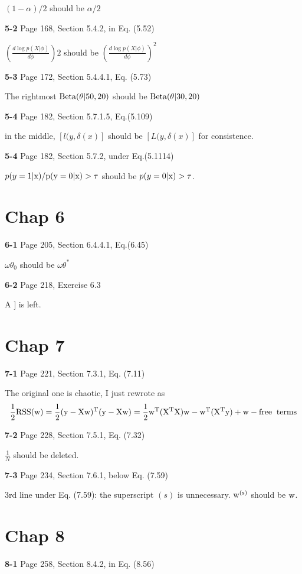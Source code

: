 \documentclass[aps,preprint,a4]{revtex4-1}
\newcommand{\nl}{\nonumber \\}
\begin{document}
$(1-\alpha)/2$ should be $\alpha/2$

{\color{red}\textbf{5-2}} Page 168, Section 5.4.2, in Eq. (5.52)

$\left(\frac{d\log p(X|\phi)}{d\phi}\right)2$ should be
$\left(\frac{d\log p(X|\phi)}{d\phi}\right)^{2}$ 

{\color{red}\textbf{5-3}} Page 172, Section 5.4.4.1, Eq. (5.73)

The rightmost $\rm Beta(\theta|50,20)$ should be
$\rm Beta(\theta|30,20)$

{\color{red}\textbf{5-4}} Page 182, Section 5.7.1.5, Eq.(5.109)

in the middle, $[l(y,\delta(x)]$ should be $[L(y,\delta(x)]$ for consistence.

{\color{red}\textbf{5-4}} Page 182, Section 5.7.2, under Eq.(5.1114)

$p(y=1|\rm x)/p(y=0|\rm x)>\tau$ should be $p(y=0|\rm x)>\tau$.

\section{Chap 6}
{\color{red}\textbf{6-1}} Page 205, Section 6.4.4.1, Eq.(6.45)

$\omega\theta_{0}$ should be $\omega\theta^{*}$

{\color{red}\textbf{6-2}} Page 218, Exercise 6.3

A $]$ is left.


\section{Chap 7}
{\color{red}\textbf{7-1}} Page 221, Section 7.3.1, Eq. (7.11)

The original one is chaotic, I just rewrote as
\begin{equation}
\frac{1}{2} \rm RSS(w) = \frac{1}{2}(y-Xw)^{T}(y-Xw) = \frac{1}{2}w^{T}(X^{T}X)w
-w^{T}(X^{T}y) + \rm{w-free \;\; terms}\nl
\end{equation}

{\color{red}\textbf{7-2}} Page 228, Section 7.5.1, Eq. (7.32)

$\frac{1}{N}$ should be deleted.

{\color{red}\textbf{7-3}} Page 234, Section 7.6.1, below Eq. (7.59)

3rd line under Eq. (7.59): the superscript $(s)$ is unnecessary. $\rm w^{(s)}$ should
be $\rm w$.


\section{Chap 8}
{\color{red}\textbf{8-1}} Page 258, Section 8.4.2, in Eq. (8.56)
\end{document}
